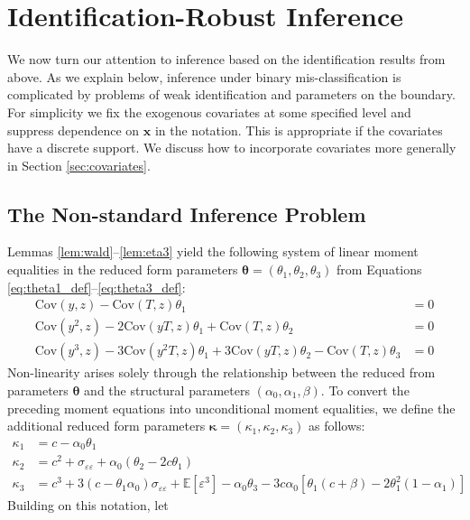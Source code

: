 \section{Identification-Robust Inference}
We now turn our attention to inference based on the identification results from above.
As we explain below, inference under binary mis-classification is complicated by problems of weak identification and parameters on the boundary.
For simplicity we fix the exogenous covariates at some specified level and suppress dependence on $\mathbf{x}$ in the notation.
This is appropriate if the covariates have a discrete support.
We discuss how to incorporate covariates more generally in Section \ref{sec:covariates}.

\subsection{The Non-standard Inference Problem}
\label{sec:problem}
Lemmas \ref{lem:wald}--\ref{lem:eta3} yield the following system of linear moment equalities in the reduced form parameters $\boldsymbol{\theta} = (\theta_1, \theta_2, \theta_3)$ from Equations \ref{eq:theta1_def}--\ref{eq:theta3_def}:
\begin{align*}
  \mbox{Cov}(y,z) - \mbox{Cov}(T,z) \theta_1 &= 0\\
  \mbox{Cov}(y^2,z) - 2\mbox{Cov}(yT,z) \theta_1 + \mbox{Cov}(T,z)\theta_2 &= 0\\
  \mbox{Cov}(y^3,z) - 3 \mbox{Cov}(y^2T,z) \theta_1 + 3\mbox{Cov}(yT,z) \theta_2 - \mbox{Cov}(T,z) \theta_3 &= 0
\end{align*}
Non-linearity arises solely through the relationship between the reduced from parameters $\boldsymbol{\theta}$ and the structural parameters $(\alpha_0, \alpha_1, \beta)$.
To convert the preceding moment equations into unconditional moment equalities, we define the additional reduced form parameters $\boldsymbol{\kappa} = (\kappa_1, \kappa_2, \kappa_3)$ as follows:
\begin{align*}
\kappa_1 &= c - \alpha_0 \theta_1\\
  \kappa_2 &= c^2 + \sigma_{\varepsilon\varepsilon} + \alpha_0 (\theta_2 - 2c \theta_1)\\
  \kappa_3 &= c^3 + 3\left( c - \theta_1 \alpha_0 \right) \sigma_{\varepsilon\varepsilon} + \mathbb{E}[\varepsilon^3] - \alpha_0 \theta_3 - 3 c \alpha_0 \left[ \theta_1 \left( c + \beta \right) - 2\theta_1^2 (1 - \alpha_1) \right]
\end{align*}
Building on this notation, let
